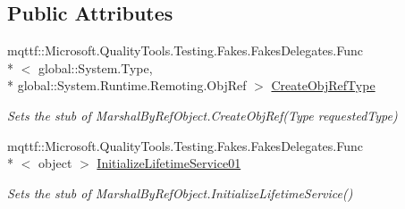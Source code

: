 \subsection*{Public Attributes}
\begin{DoxyCompactItemize}
\item 
mqttf\-::\-Microsoft.\-Quality\-Tools.\-Testing.\-Fakes.\-Fakes\-Delegates.\-Func\\*
$<$ global\-::\-System.\-Type, \\*
global\-::\-System.\-Runtime.\-Remoting.\-Obj\-Ref $>$ \hyperlink{class_system_1_1_fakes_1_1_stub_marshal_by_ref_object_ac583248053bb194e439d903988a52b41}{Create\-Obj\-Ref\-Type}
\begin{DoxyCompactList}\small\item\em Sets the stub of Marshal\-By\-Ref\-Object.\-Create\-Obj\-Ref(\-Type requested\-Type)\end{DoxyCompactList}\item 
mqttf\-::\-Microsoft.\-Quality\-Tools.\-Testing.\-Fakes.\-Fakes\-Delegates.\-Func\\*
$<$ object $>$ \hyperlink{class_system_1_1_fakes_1_1_stub_marshal_by_ref_object_a3c8b8e8d31888cd89a1b4245b1c6ca56}{Initialize\-Lifetime\-Service01}
\begin{DoxyCompactList}\small\item\em Sets the stub of Marshal\-By\-Ref\-Object.\-Initialize\-Lifetime\-Service()\end{DoxyCompactList}\end{DoxyCompactItemize}
